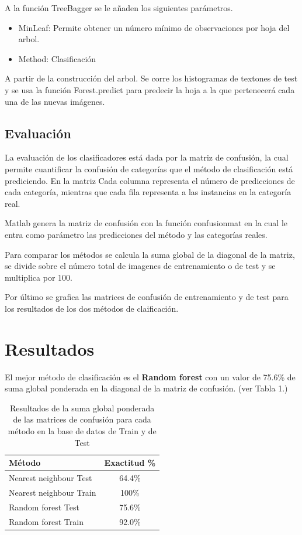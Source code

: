 \documentclass[10pt,twocolumn,letterpaper]{article}
\begin{document}
A la función TreeBagger se le añaden los siguientes parámetros.
\begin{itemize}
\item MinLeaf: Permite obtener un número mínimo de observaciones por hoja del arbol.
\item Method: Clasificación 
\end{itemize}

A partir de la construcción del arbol. Se corre los histogramas de textones de test y se usa la función Forest.predict para predecir la hoja a la que pertenecerá cada una de las nuevas imágenes. 


\subsection{Evaluación}

La evaluación de los clasificadores está dada por la matriz de confusión, la cual permite cuantificar la confusión de categorías que el método de clasificación está prediciendo. En la matriz Cada columna representa el número de predicciones de cada categoría, mientras que cada fila representa a las instancias en la categoría real.

Matlab genera la matriz de confusión con la función confusionmat en la cual le entra como parámetro las predicciones del método y las categorías reales. 

Para comparar los métodos se calcula la suma global de la diagonal de la matriz, se divide sobre el número total de imagenes de entrenamiento o de test y se multiplica por 100.

Por último se grafica las matrices de confusión de entrenamiento y de test para los resultados de los dos métodos de claificación. 
\\
\section{Resultados}

El mejor método de clasificación es el \textbf{Random forest} con un valor de 75.6\% de suma global ponderada en la diagonal de la matriz de confusión. (ver Tabla 1.)  

\begin{table}
\begin{center}
\begin{tabular}{|l|c|}
\hline
Método & Exactitud \% \\
\hline\hline
Nearest neighbour Test &  64.4\%  \\
Nearest neighbour Train &  100\% \\
Random forest Test& 75.6\% \\
Random forest Train& 92.0\% \\
\hline
\end{tabular}
\end{center}
\caption{Resultados de la suma global ponderada de las matrices de confusión para cada método en la base de datos de Train y de Test}
\end{table}
\end{document}
